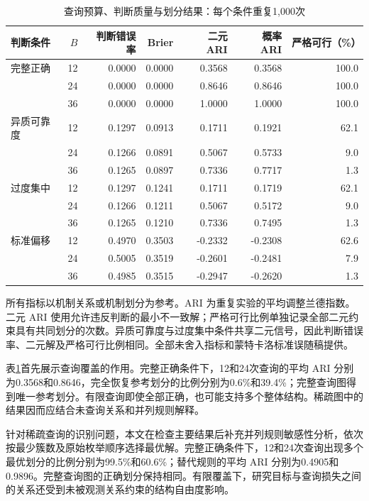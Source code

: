 \documentclass[UTF8,a4paper,zihao=-4,fontset=fandol]{ctexart}
\begin{document}
\begin{table}[htbp]
\centering\small
\caption{查询预算、判断质量与划分结果：每个条件重复1,000次}\label{tab:simulation}
\begin{tabular}{@{}lrrrrrr@{}}
\toprule
判断条件 & $B$ & 判断错误率 & Brier & 二元 ARI & 概率 ARI & 严格可行（\%） \\
\midrule
完整正确 & 12 & 0.0000 & 0.0000 & 0.3568 & 0.3568 & 100.0 \\
 & 24 & 0.0000 & 0.0000 & 0.8646 & 0.8646 & 100.0 \\
 & 36 & 0.0000 & 0.0000 & 1.0000 & 1.0000 & 100.0 \\
\addlinespace
异质可靠度 & 12 & 0.1297 & 0.0913 & 0.1711 & 0.1921 & 62.1 \\
 & 24 & 0.1266 & 0.0891 & 0.5067 & 0.5733 & 9.0 \\
 & 36 & 0.1265 & 0.0897 & 0.7336 & 0.7717 & 1.3 \\
\addlinespace
过度集中 & 12 & 0.1297 & 0.1241 & 0.1711 & 0.1719 & 62.1 \\
 & 24 & 0.1266 & 0.1211 & 0.5067 & 0.5172 & 9.0 \\
 & 36 & 0.1265 & 0.1210 & 0.7336 & 0.7495 & 1.3 \\
\addlinespace
标准偏移 & 12 & 0.4970 & 0.3503 & -0.2332 & -0.2308 & 62.6 \\
 & 24 & 0.5005 & 0.3519 & -0.2601 & -0.2481 & 7.9 \\
 & 36 & 0.4985 & 0.3515 & -0.2947 & -0.2620 & 1.3 \\
\bottomrule
\end{tabular}
\vspace{0.3em}
\parbox{\textwidth}{\footnotesize 所有指标以机制关系或机制划分为参考。ARI 为重复实验的平均调整兰德指数。二元 ARI 使用允许违反判断的最小不一致解；严格可行比例单独记录全部二元约束具有共同划分的次数。异质可靠度与过度集中条件共享二元信号，因此判断错误率、二元解及严格可行比例相同。全部未舍入指标和蒙特卡洛标准误随稿提供。}
\end{table}

表\ref{tab:simulation}首先展示查询覆盖的作用。完整正确条件下，12和24次查询的平均 ARI 分别为0.3568和0.8646，完全恢复参考划分的比例分别为0.6\%和39.4\%；完整查询图得到唯一参考划分。有限查询即使全部正确，也可能支持多个整体结构。稀疏图中的结果因而应结合未查询关系和并列规则解释。

针对稀疏查询的识别问题，本文在检查主要结果后补充并列规则敏感性分析，依次按最少簇数及原始枚举顺序选择最优解。完整正确条件下，12和24次查询出现多个最优划分的比例分别为99.5\%和60.6\%；替代规则的平均 ARI 分别为0.4905和0.9896。完整查询图的正确划分保持相同。有限覆盖下，研究目标与查询损失之间的关系还受到未被观测关系约束的结构自由度影响。
\end{document}
